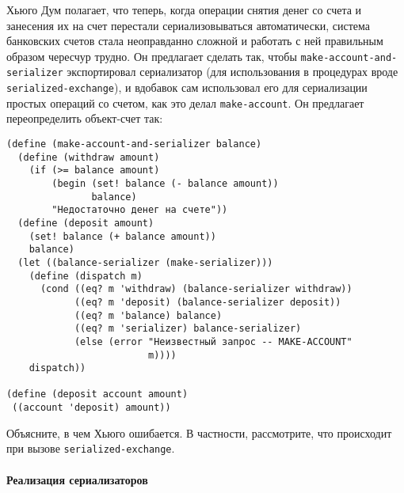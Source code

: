 \begin{exercise}{3.45}\label{EX3.45}%
Хьюго Дум полагает, что теперь, когда операции
снятия денег со счета и занесения их на счет перестали
сериализовываться автоматически, система банковских счетов
стала неоправданно сложной и работать с ней правильным образом чересчур
трудно.  Он предлагает сделать так, чтобы
{\tt make-account-and-serializer} экспортировал сериализатор
(для использования в процедурах вроде
{\tt serialized-exchange}), и вдобавок сам использовал его для
сериализации простых операций со счетом, как это делал
{\tt make-account}.  Он предлагает переопределить объект-счет
так:

\begin{Verbatim}[fontsize=\small]
(define (make-account-and-serializer balance)
  (define (withdraw amount)
    (if (>= balance amount)
        (begin (set! balance (- balance amount))
               balance)
        "Недостаточно денег на счете"))
  (define (deposit amount)
    (set! balance (+ balance amount))
    balance)
  (let ((balance-serializer (make-serializer)))
    (define (dispatch m)
      (cond ((eq? m 'withdraw) (balance-serializer withdraw))
            ((eq? m 'deposit) (balance-serializer deposit))
            ((eq? m 'balance) balance)
            ((eq? m 'serializer) balance-serializer)
            (else (error "Неизвестный запрос -- MAKE-ACCOUNT"
                         m))))
    dispatch))

(define (deposit account amount)
 ((account 'deposit) amount))
\end{Verbatim}

Объясните, в чем Хьюго ошибается.  В частности, рассмотрите, что
происходит при вызове {\tt serialized-exchange}.
\end{exercise}

\paragraph{Реализация сериализаторов}

